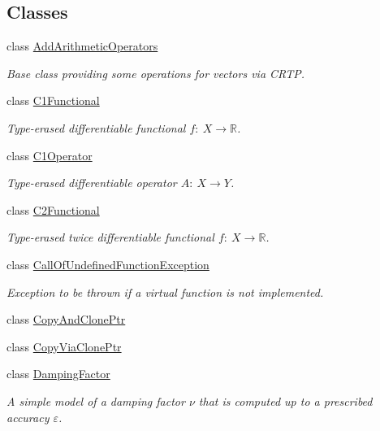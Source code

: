 \subsection*{Classes}
\begin{DoxyCompactItemize}
\item 
class \hyperlink{classSpacy_1_1AddArithmeticOperators}{Add\+Arithmetic\+Operators}
\begin{DoxyCompactList}\small\item\em Base class providing some operations for vectors via C\+R\+T\+P. \end{DoxyCompactList}\item 
class \hyperlink{classSpacy_1_1C1Functional}{C1\+Functional}
\begin{DoxyCompactList}\small\item\em Type-\/erased differentiable functional $f:\ X \to \mathbb{R} $. \end{DoxyCompactList}\item 
class \hyperlink{classSpacy_1_1C1Operator}{C1\+Operator}
\begin{DoxyCompactList}\small\item\em Type-\/erased differentiable operator $A:\ X \to Y $. \end{DoxyCompactList}\item 
class \hyperlink{classSpacy_1_1C2Functional}{C2\+Functional}
\begin{DoxyCompactList}\small\item\em Type-\/erased twice differentiable functional $f:\ X \to \mathbb{R} $. \end{DoxyCompactList}\item 
class \hyperlink{classSpacy_1_1CallOfUndefinedFunctionException}{Call\+Of\+Undefined\+Function\+Exception}
\begin{DoxyCompactList}\small\item\em Exception to be thrown if a virtual function is not implemented. \end{DoxyCompactList}\item 
class \hyperlink{classSpacy_1_1CopyAndClonePtr}{Copy\+And\+Clone\+Ptr}
\item 
class \hyperlink{classSpacy_1_1CopyViaClonePtr}{Copy\+Via\+Clone\+Ptr}
\item 
class \hyperlink{classSpacy_1_1DampingFactor}{Damping\+Factor}
\begin{DoxyCompactList}\small\item\em A simple model of a damping factor $\nu$ that is computed up to a prescribed accuracy $\varepsilon$. \end{DoxyCompactList}\item 

\end{DoxyCompactItemize}
